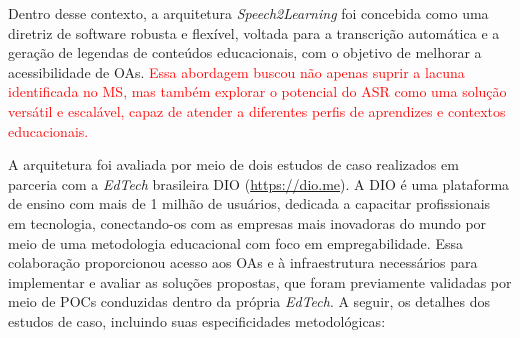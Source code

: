 Dentro desse contexto, a arquitetura \textit{Speech2Learning} foi concebida como uma diretriz de software robusta e flexível, voltada para a transcrição automática e a geração de legendas de conteúdos educacionais, com o objetivo de melhorar a acessibilidade de OAs. \textcolor{red}{Essa abordagem buscou não apenas suprir a lacuna identificada no MS, mas também explorar o potencial do ASR como uma solução versátil e escalável, capaz de atender a diferentes perfis de aprendizes e contextos educacionais.}

A arquitetura foi avaliada por meio de dois estudos de caso realizados em parceria com a \textit{EdTech} brasileira DIO (\url{https://dio.me}). A DIO é uma plataforma de ensino com mais de 1 milhão de usuários, dedicada a capacitar profissionais em tecnologia, conectando-os com as empresas mais inovadoras do mundo por meio de uma metodologia educacional com foco em empregabilidade. Essa colaboração proporcionou acesso aos OAs e à infraestrutura necessários para implementar e avaliar as soluções propostas, que foram previamente validadas por meio de POCs conduzidas dentro da própria \textit{EdTech}. A seguir, os detalhes dos estudos de caso, incluindo suas especificidades metodológicas:

